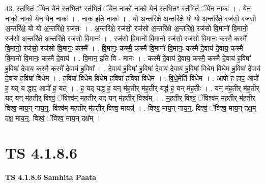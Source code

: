 \documentclass[17pt]{extarticle}
\begin{document}
43. स्त॒भि॒तं ॅयेन॒ येन॑ स्तभि॒तꣳ स्त॑भि॒तं ॅयेन॒ नाको॒ नाको॒ येन॑ स्तभि॒तꣳ स्त॑भि॒तं ॅयेन॒ नाकः॑ । . येन॒ नाको॒ नाको॒ येन॒ येन॒ नाकः॑ । . नाक॒ इति॒ नाकः॑ । . यो अ॒न्तरि॑क्षे अ॒न्तरि॑क्षे॒ यो यो अ॒न्तरि॑क्षे॒ रज॑सो॒ रज॑सो अ॒न्तरि॑क्षे॒ यो यो अ॒न्तरि॑क्षे॒ रज॑सः । . अ॒न्तरि॑क्षे॒ रज॑सो॒ रज॑सो अ॒न्तरि॑क्षे अ॒न्तरि॑क्षे॒ रज॑सो वि॒मानो॑ वि॒मानो॒ रज॑सो अ॒न्तरि॑क्षे अ॒न्तरि॑क्षे॒ रज॑सो वि॒मानः॑ । . रज॑सो वि॒मानो॑ वि॒मानो॒ रज॑सो॒ रज॑सो वि॒मानः॒ कस्मै॒ कस्मै॑ वि॒मानो॒ रज॑सो॒ रज॑सो वि॒मानः॒ कस्मै᳚ । . वि॒मानः॒ कस्मै॒ कस्मै॑ वि॒मानो॑ वि॒मानः॒ कस्मै॑ दे॒वाय॑ दे॒वाय॒ कस्मै॑ वि॒मानो॑ वि॒मानः॒ कस्मै॑ दे॒वाय॑ । . वि॒मान॒ इति॑ वि - मानः॑ । . कस्मै॑ दे॒वाय॑ दे॒वाय॒ कस्मै॒ कस्मै॑ दे॒वाय॑ ह॒विषा॑ ह॒विषा॑ दे॒वाय॒ कस्मै॒ कस्मै॑ दे॒वाय॑ ह॒विषा᳚ । . दे॒वाय॑ ह॒विषा॑ ह॒विषा॑ दे॒वाय॑ दे॒वाय॑ ह॒विषा॑ विधेम विधेम ह॒विषा॑ दे॒वाय॑ दे॒वाय॑ ह॒विषा॑ विधेम । . ह॒विषा॑ विधेम विधेम ह॒विषा॑ ह॒विषा॑ विधेम । . वि॒धे॒मेति॑ विधेम । . आपो॑ ह॒ हाप॒ आपो॑ ह॒ यद् य द्धाप॒ आपो॑ ह॒ यत् । . ह॒ यद् यद्ध॑ ह॒ यन् म॑ह॒तीर् म॑ह॒तीर् यद्ध॑ ह॒ यन् म॑ह॒तीः । . यन् म॑ह॒तीर् म॑ह॒तीर् यद् यन् म॑ह॒तीर् विश्वं॒ ॅविश्व॑म् मह॒तीर् यद् यन् म॑ह॒तीर् विश्व᳚म् । . म॒ह॒तीर् विश्वं॒ ॅविश्व॑म् मह॒तीर् म॑ह॒तीर् विश्व॒ माय॒न् नाय॒न्॒. विश्व॑म् मह॒तीर् म॑ह॒तीर् विश्व॒ मायन्न्॑ । . विश्व॒ माय॒न् नाय॒न्॒. विश्वं॒ ॅविश्व॒ माय॒न् दक्ष॒म् दक्ष॒ माय॒न्॒. विश्वं॒ ॅविश्व॒ माय॒न् दक्ष᳚म् । \newline
\pagebreak
{}

\section{ TS 4.1.8.6 }

\textbf{TS 4.1.8.6 } \newline
\textbf{Samhita Paata} \newline
\end{document}
